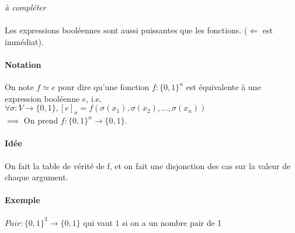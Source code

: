 
\textit{à compléter}\\\\

Les expressions booléennes sont aussi puissantes que les fonctions. ($\Leftarrow$ est immédiat).

\paragraph{Notation} On note $f \simeq e$ pour dire qu'une fonction $f : \{0,1\}^n$ est équivalente à une expression booléenne $e$, i.e. $\forall \sigma : V \to \{0,1\}, [e]_\sigma = f\left(\sigma(x_1), \sigma(x_2), \dots, \sigma(x_n)\right)$\\

$\boxed{\implies}$ On prend $f : \{0,1\}^n \to \{0,1\}$.
\paragraph{Idée} On fait la table de vérité de f, et on fait une disjonction des cas sur la valeur de chaque argument.
\paragraph{Exemple} $Pair : \{0,1\}^3 \to \{0,1\}$ qui vaut $1$ si on a un nombre pair de 1 \\



